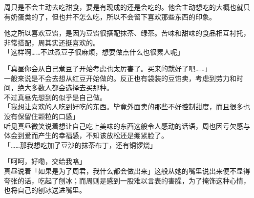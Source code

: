 周只是不会主动去吃甜食，要是有现成的还是会吃的。他会主动想吃的大概也就只有奶蛋类的了，但也并不怎么吃，所以不会留下喜欢那些东西的印象。

他之所以喜欢豆馅，是因为豆馅很搭配抹茶、绿茶。苦味和甜味的食品相互衬托，非常搭配，周其实还挺喜欢的。\\

「这样啊……不过煮豆子很麻烦，想要做点什么也很累人呢」

「真昼你会从自己煮豆子开始考虑也太厉害了。买来的就好了吧……」\\

一般来说是不会去想从红豆开始做的。反正也有袋装的豆馅卖，考虑到劳力和时间，绝大多数人都会选择去买那种。\\

不过真昼先想到的似乎是自己做。\\

「我想让喜欢的人吃到好吃的东西。毕竟外面卖的那些不好控制甜度，而且很多也没有保留住颗粒的口感」\\

听见真昼微笑说着想让自己吃上美味的东西这般令人感动的话语，周也因亏欠感与体会到爱而产生的幸福感，不知该放松还是绷紧脸了。\\

「……那我想吃加了豆沙的抹茶布丁，还有铜锣烧」

「呵呵，好嘞，交给我咯」\\

真昼说着「如果是为了周君，我什么都会做出来」这般从她的嘴里说出来便不显得夸张的话，吃起了刨冰；而周则是感到一股难以言表的害臊，为了掩饰这种心情，也将自己的刨冰送进嘴里。
